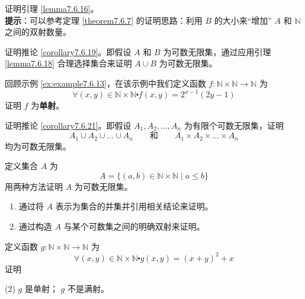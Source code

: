 \begin{exercise}
    证明引理 \ref{lemma7.6.16}。\label{exc:exercises7.8.19}\\
    \textbf{提示}：可以参考定理 \ref{theorem7.6.7} 的证明思路：利用 $B$ 的大小来``增加'' $A$ 和 $\mathbb{N}$ 之间的双射数量。
\end{exercise}

\begin{exercise}
    证明推论 \ref{corollary7.6.19}。即假设 $A$ 和 $B$ 为可数无限集，通过应用引理 \ref{lemma7.6.18} 合理选择集合来证明 $A \cup B$ 为可数无限集。 \label{exc:exercises7.8.20}
\end{exercise}

\begin{exercise}
    回顾示例 \ref{ex:example7.6.13}，在该示例中我们定义函数 $f : \mathbb{N} \times \mathbb{N} \to \mathbb{N}$ 为
    \[\forall (x, y) \in \mathbb{N} \times \mathbb{N} \centerdot f(x, y) = 2^{x-1}(2y - 1)\]
    证明 $f$ 为\textbf{单射}。\label{exc:exercises7.8.21}
\end{exercise}

\begin{exercise}
    证明推论 \ref{corollary7.6.21}。即假设 $A_1, A_2,\dots,A_n$ 为有限个可数无限集，证明
    \[A_1 \cup A_2 \cup \dots \cup A_n \qquad \text{和} \qquad A_1 \times A_2 \times \dots \times A_n\]
    均为可数无限集。\label{exc:exercises7.8.22}
\end{exercise}

\begin{exercise}
    定义集合 $A$ 为
    \[A = \{(a, b) \in \mathbb{N} \times \mathbb{N} \mid a \le b\}\]
    用两种方法证明 $A$ 为可数无限集。
    \begin{enumerate}[label=(\arabic*)]
        \item 通过将 $A$ 表示为集合的并集并引用相关结论来证明。
        \item 通过构造 $A$ 与某个可数集之间的明确双射来证明。
    \end{enumerate}
\end{exercise}

\begin{exercise}
    定义函数 $g : \mathbb{N} \times \mathbb{N} \to \mathbb{N}$ 为
    \[\forall (x, y) \in \mathbb{N} \times \mathbb{N} \centerdot g(x, y) = (x + y)^2 + x\]
    证明
    \begin{tasks}[label=(\alph*)](2)
        \task $g$ 是单射；
        \task $g$ 不是满射。
    \end{tasks}
\end{exercise}

